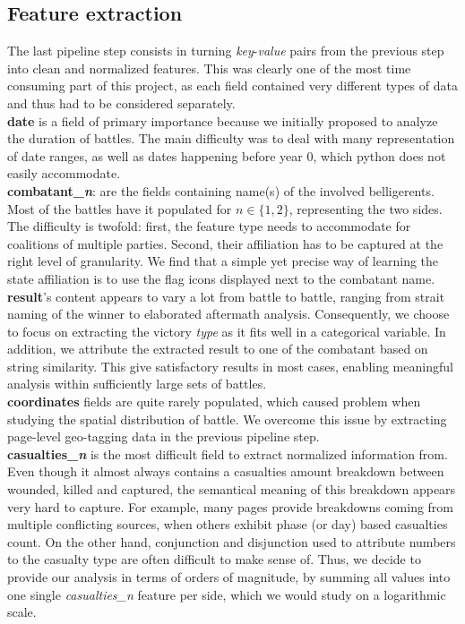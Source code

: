 \subsection{Feature extraction}
The last pipeline step consists in turning \textit{key}-\textit{value} pairs from the previous step into clean and normalized features. This was clearly one of the most time consuming part of this project, as each field contained very different types of data and thus had to be considered separately. \\
\textbf{date} is a field of primary importance because we initially proposed to analyze the duration of battles. The main difficulty was to deal with many representation of date ranges, as well as dates happening before year 0, which python does not easily accommodate.\\
\textbf{combatant\_\textit{n}}: are the fields containing name(s) of the involved belligerents. Most of the battles have it populated for $n \in \{1, 2\}$, representing the two sides. The difficulty is twofold: first, the feature type needs to accommodate for coalitions of multiple parties. Second, their affiliation has to be captured at the right level of granularity. We find that a simple yet precise way of learning the state affiliation is to use the flag icons displayed next to the combatant name.\\
\textbf{result}'s content appears to vary a lot from battle to battle, ranging from strait naming of the winner to elaborated aftermath analysis. Consequently, we choose to focus on extracting the victory \textit{type} as it fits well in a categorical variable. In addition, we attribute the extracted result to one of the combatant based on string similarity. This give satisfactory results in most cases, enabling meaningful analysis within sufficiently large sets of battles.\\
\textbf{coordinates} fields are quite rarely populated, which caused problem when studying the spatial distribution of battle. We overcome this issue by extracting page-level geo-tagging data in the previous pipeline step.\\
\textbf{casualties\_\textit{n}} is the most difficult field to extract normalized information from. Even though  it almost always contains a casualties amount breakdown between wounded, killed and captured, the semantical meaning of this breakdown appears very hard to capture. For example, many pages provide breakdowns coming from multiple conflicting sources, when others exhibit phase (or day) based casualties count. On the other hand, conjunction and disjunction used to attribute numbers to the casualty type are often difficult to make sense of. Thus, we decide to provide our analysis in terms of orders of magnitude, by summing all values into one single \textit{casualties\_\textit{n}} feature per side, which we would study on a logarithmic scale.
